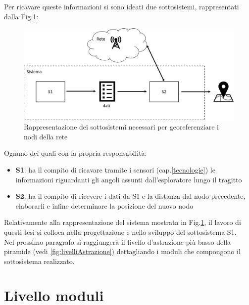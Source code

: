 Per ricavare queste informazioni si sono ideati due sottosistemi, rappresentati dalla Fig.\ref{fig:sistema_liv1}:
\begin{figure}[H]
	\centering
	\includegraphics[scale=0.3]{DescrizioneDelSistema/sistema_liv1.png}
	\caption{Rappresentazione dei sottosistemi necessari per georeferenziare i nodi della rete }
	\label{fig:sistema_liv1}
\end{figure}
Ognuno dei quali con la propria responsabilità:
\begin{itemize}
	\item \textbf{S1}: ha il compito di ricavare tramite i sensori (cap.\ref{tecnologie}) le informazioni riguardanti gli angoli assunti dall'esploratore lungo il tragitto
	\item \textbf{S2}: ha il compito di ricevere i dati da S1 e la distanza dal nodo precedente, elaborarli e infine determinare la posizione del nuovo nodo
\end{itemize}

Relativamente alla rappresentazione del sistema mostrata in Fig.\ref{fig:sistema_liv1}, il lavoro di questi tesi si colloca nella progettazione e nello sviluppo del sottosistema S1.\\
Nel prossimo paragrafo si raggiungerà il livello d'astrazione più basso della piramide (vedi \ref{fig:livelliAstrazione}) dettagliando i moduli che compongono il sottosistema realizzato.\newpage


\section{Livello moduli}

